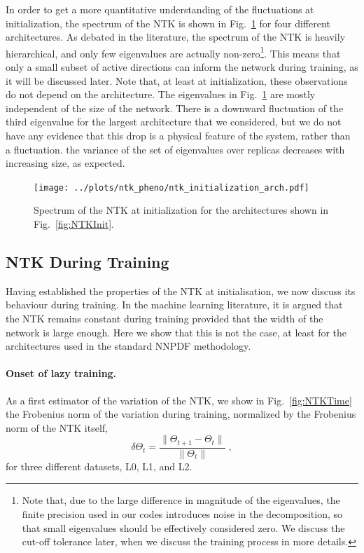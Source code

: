 In order to get a more quantitative understanding of the fluctuations 
at initialization, the spectrum of the NTK is shown in Fig.~\ref{fig:NTKSpectrum} for four different architectures. 
As debated in the
literature, the spectrum of the NTK is heavily hierarchical, and only few
eigenvalues are actually non-zero\footnote{Note that, due to the large
difference in magnitude of the eigenvalues, the finite precision used in our
codes introduces noise in the decomposition, so that small eigenvalues
should be effectively considered zero. We discuss the cut-off tolerance
later, when we discuss the training process in more details.}. This means that
only a small subset of active directions can inform the network during training,
as it will be discussed later. Note that, at least at initialization, these
observations do not depend on the architecture. The eigenvalues in Fig.~\ref{fig:NTKSpectrum} 
are mostly independent of the size of the network. There is a downward fluctuation of the third
eigenvalue for the largest architecture that we considered, but we do not have any 
evidence that this drop is a physical feature of the system, rather than a fluctuation. 
the variance of the set of eigenvalues over replicas decreases with increasing 
size, as expected. 

\begin{figure}[ht!]
  \centering

  \texttt{[image: ../plots/ntk\_pheno/ntk\_initialization\_arch.pdf]}
  \caption{Spectrum of the NTK at initialization for the architectures shown in
  Fig.~\ref{fig:NTKInit}. }
  \label{fig:NTKSpectrum}
\end{figure}

\subsection{NTK During Training}
Having established the properties of the NTK at initialisation, we now discuss
its behaviour during training. In the machine learning literature, it is argued
that the NTK remains constant during training provided that the width of the
network is large enough. Here we show that this is not the case, at least for
the architectures used in the standard NNPDF methodology. 

\paragraph{Onset of lazy training.} As a first estimator of the variation of the
NTK, we show in Fig.~\ref{fig:NTKTime} the 
Frobenius norm of the variation
during training, normalized by the Frobenius norm of the NTK itself, 
\begin{equation}
\delta \Theta_t = \frac{\lVert \Theta_{t+1} - \Theta_t \rVert}{\lVert \Theta_t \rVert} \;,
\label{eq:DeltaNTK}
\end{equation}
for three different datasets, L0, L1, and L2. 

